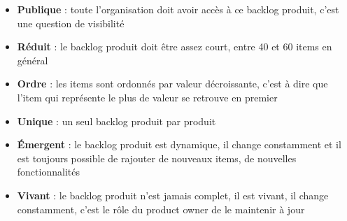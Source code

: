 \begin{itemize}
  \item \textbf{Publique} : toute l'organisation doit avoir accès à ce backlog produit, c'est une question de visibilité
  \item \textbf{Réduit} : le backlog produit doit être assez court, entre 40 et 60 items en général
  \item \textbf{Ordre} : les items sont ordonnés par valeur décroissante, c'est à dire que l'item qui représente le plus de valeur se retrouve en premier
  \item \textbf{Unique} : un seul backlog produit par produit
  \item \textbf{Émergent} : le backlog produit est dynamique, il change constamment et il est toujours possible de rajouter de nouveaux items, de nouvelles fonctionnalités
  \item \textbf{Vivant} : le backlog produit n'est jamais complet, il est vivant, il change constamment, c'est le rôle du product owner de le maintenir à jour
\end{itemize}

